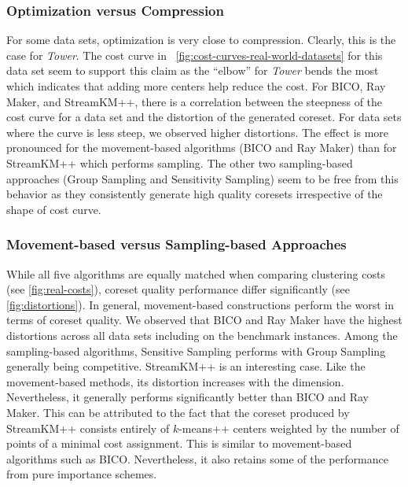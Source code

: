 \subsubsection*{Optimization versus Compression}
For some data sets, optimization is very close to compression. 
Clearly, this is the case for \textit{Tower}. The cost curve in ~\cref{fig:cost-curves-real-world-datasets} for this data set seem to support this claim as the ``elbow'' for \textit{Tower} bends the most which indicates that adding more centers help reduce the cost. For BICO, Ray Maker, and StreamKM++, there is a correlation between the steepness of the cost curve for a data set and the distortion of the generated coreset. 
For data sets where the curve is less steep, we observed higher distortions. The effect is more pronounced for the movement-based algorithms (BICO and Ray Maker) than for StreamKM++ which performs sampling. The other two sampling-based approaches (Group Sampling and Sensitivity Sampling) seem to be free from this behavior as they consistently generate high quality coresets irrespective of the shape of cost curve.


\subsubsection*{Movement-based versus Sampling-based Approaches}
While all five algorithms are equally matched when comparing clustering costs (see  \cref{fig:real-costs}), coreset quality performance differ significantly (see \cref{fig:distortions}). 
In general, movement-based constructions perform the worst in terms of coreset quality. 
We observed that BICO and Ray Maker have the highest distortions across all data sets including on the benchmark instances. Among the sampling-based algorithms, Sensitive Sampling performs with Group Sampling generally being competitive. StreamKM++ is an interesting case. Like the movement-based methods, its distortion increases with the dimension. Nevertheless, it generally performs significantly better than BICO and Ray Maker. This can be attributed to the fact that the coreset produced by StreamKM++ consists entirely of $k$-means++ centers weighted by the number of points of a minimal cost assignment. This is similar to movement-based algorithms such as BICO. Nevertheless, it also retains some of the performance from pure importance schemes.





